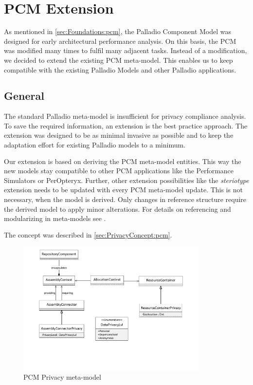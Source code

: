 
\chapter{PCM Extension}
\label{ch:pcmExtension}

As mentioned in \autoref{sec:Foundations:pcm}, the Palladio Component Model was designed for early architectural performance analysis. On this basis, the PCM was modified many times to fulfil many adjacent tasks. Instead of a modification, we decided to extend the existing PCM meta-model. This enables us to keep compatible with the existing Palladio Models and other Palladio applications.

\section{General}
\label{sec:pcmExtension:general}

The standard Palladio meta-model is insufficient for privacy compliance analysis. To save the required information, an extension is the best practice approach. The extension was designed to be as minimal invasive as possible and to keep the adaptation effort for existing Palladio models to a minimum.

Our extension is based on deriving the PCM meta-model entities. This way the new models stay compatible to other PCM applications like the Performance Simulators or PerOpteryx. Further, other extension possibilities like the \textit{steriotype} extension needs to be updated with every PCM meta-model update. This is not necessary, when the model is derived. Only changes in reference structure require the derived model to apply minor alterations. For details on referencing and modularizing in meta-models see \cite{Strittmatter.2015}.

The concept was described in \autoref{sec:PrivacyConcept:pcm}.

\begin{figure}[h]
	\centering
	\includegraphics[trim = 20mm 50mm 20mm 05mm, clip, width=0.85\textwidth]{graphs/pcm_privacy_meta}
	\caption{PCM Privacy meta-model}
	\label{fig:pcmExtension:meta}
\end{figure}


